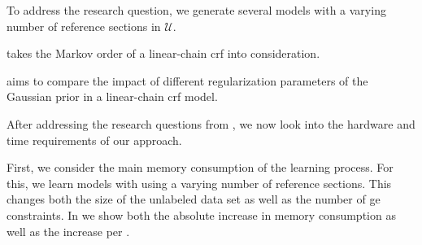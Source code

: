 To address the research question, we generate several models with a varying number of reference sections in $\mathcal{U}$.

 takes the Markov order of a \gls{linear-chain crf} into consideration.

\bigskip


 aims to compare the impact of different regularization parameters of the Gaussian prior in a \gls{linear-chain crf} model.

\bigskip

After addressing the research questions from , we now look into the hardware and time requirements of our approach.

First, we consider the main memory consumption of the learning process.
For this, we learn models with using a varying number of reference sections.
This changes both the size of the unlabeled data set as well as the number of \gls{ge} constraints.
In  we show both the absolute increase in memory consumption as well as the increase per .







